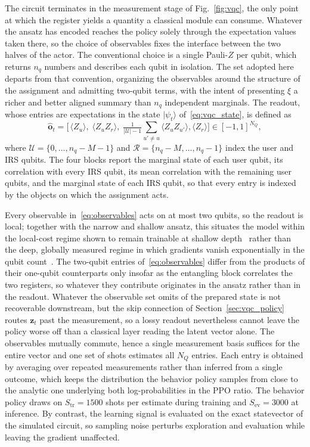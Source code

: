 \documentclass[12pt,onecolumn]{IEEEtran}
\begin{document}
The circuit terminates in the measurement stage of Fig.~\ref{fig:vqc}, the only point at which the register yields a quantity a classical module can consume.
Whatever the ansatz has encoded reaches the policy solely through the expectation values taken there, so the choice of observables fixes the interface between the two halves of the actor.
The conventional choice is a single Pauli-$Z$ per qubit, which returns $n_q$ numbers and describes each qubit in isolation.
The set adopted here departs from that convention, organizing the observables around the structure of the assignment and admitting two-qubit terms, with the intent of presenting $\xi$ a richer and better aligned summary than $n_q$ independent marginals.
The readout, whose entries are expectations in the state $|\psi_t\rangle$
of~\eqref{eq:vqc_state}, is defined as
\begin{equation}
    \hat{\mathbf{o}}_t
    =
    \bigl[\,
    \langle Z_u\rangle,\;
    \langle Z_u Z_r\rangle,\;
    \tfrac{1}{|\mathcal{U}|-1}\!\!\sum_{u'\neq u}\!\langle Z_u Z_{u'}\rangle,
    \langle Z_r\rangle\bigr]
    \in [-1,1]^{N_Q},
    \label{eq:observables}
\end{equation}
where $\mathcal{U}=\{0,\dots,n_q{-}M{-}1\}$ and $\mathcal{R}=\{n_q{-}M,\dots,n_q{-}1\}$ index the user and IRS qubits.
The four blocks report the marginal state of each user qubit, its correlation with every IRS qubit, its mean correlation with the remaining user qubits, and the marginal state of each IRS qubit, so that every entry is indexed by the objects on which the assignment acts.

Every observable in~\eqref{eq:observables} acts on at most two qubits, so the readout is local; together with the narrow and shallow ansatz, this situates the model within the local-cost regime shown to remain trainable at shallow depth~\cite{cerezo2021cost} rather than the deep, globally measured regime in which gradients vanish exponentially in the qubit count~\cite{mcclean2018barren}.
The two-qubit entries of~\eqref{eq:observables} differ from the products of their one-qubit counterparts only insofar as the entangling block correlates the two registers, so whatever they contribute originates in the ansatz rather than in the readout.
Whatever the observable set omits of the prepared state is not recoverable downstream, but the skip connection of Section~\ref{sec:vqc_policy} routes $\mathbf{z}_t$ past the measurement, so a lossy readout nevertheless cannot leave the policy worse off than a classical layer reading the latent vector alone.
The observables mutually commute, hence a single measurement basis suffices for the entire vector and one set of shots estimates all $N_Q$ entries.
Each entry is obtained by averaging over repeated measurements rather than inferred from a single outcome, which keeps the distribution the behavior policy samples from close to the analytic one underlying both log-probabilities in the PPO ratio.
The behavior policy draws on $S_{\mathrm{tr}}=1500$ shots per estimate during training and $S_{\mathrm{ev}}=3000$ at inference.
By contrast, the learning signal is evaluated on the exact statevector of the simulated circuit, so sampling noise perturbs exploration and evaluation while leaving the gradient unaffected.
\end{document}
